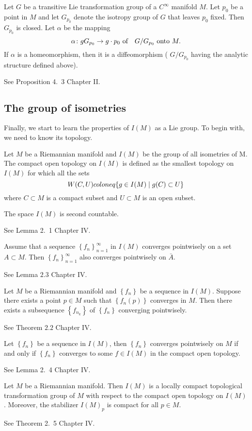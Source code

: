 \begin{proposition}
	Let $G$ be a transitive Lie transformation group of a
	$C^{\infty}$ manifold $M$. Let $p_{0}$ be a point in $M$ and
	let $G_{p_{0}}$ denote the isotropy group of $G$ that leaves
	$p_{0}$ fixed. Then $G_{p_0}$ is closed. Let $\alpha$ be the
	mapping
	\[
	\alpha\:g G_{p_{0}} \rightarrow g \cdot p_{0} \text { of \
	}\  G / G_{p_{0}} \text { onto } M.
	\]
	If $\alpha$ is a homeomorphism, then it is a diffeomorphism (
	$G / G_{p_{0}}$ having the analytic structure defined above).
\end{proposition}
\bproof
See \cite{Hel} Proposition 4.\ 3 Chapter II.
\eproof
\subsection{The group of isometries}

Finally, we start to learn the properties of $I(M)$ as a Lie
group. To begin with, we need to know its topology. 

\begin{definition}
	Let $M$ be a Riemannian manifold and $I(M)$ be the group of
	all isometries of
	M. The compact open topology on $I(M)$ is defined as the
	smallest topology on $I(M)$ for which all the sets
	\[
	W(C, U)\\coloneq \{ g \in I(M) \mid g (C) \subset U \}
	\]
	where $C \subset M$ is a compact subset and $U \subset M$ is
	an open subset.
\end{definition}
\begin{lemma}
	The space $I(M) $ is second countable.
\end{lemma}
\bproof
See \cite{Hel} Lemma 2.\ 1 Chapter IV.
\eproof
\begin{lemma}
	Assume that a sequence $\left\{ f_{n}
	\right\}_{n=1}^{\infty}$ in $I(M)$ converges pointwisely on a
	set $A \subset M$. Then $\left\{ f_{n}
	\right\}_{n=1}^{\infty}$ also converges pointwisely on
	$\bar{A}$.
\end{lemma}
\bproof
See \cite{Hel} Lemma $2.3$ Chapter IV.
\eproof
\begin{lemma}
	Let $M$ be a Riemannian manifold and $\left\{ f_{n} \right\}$
	be a sequence in $I(M) .$ Suppose there exists a point $p \in
	M$ such that $\left\{ f_{n} (p) \right\}$ converges in $M$.
	Then there exists a subsequence $\left\{f_{n_{k}}\right\}$ of
	$\left\{f_{n}\right\}$ converging pointwisely.
\end{lemma}
\bproof
See \cite{Hel} Theorem $2.2$ Chapter IV.
\eproof
\begin{theorem}
	Let $\left\{ f_{n} \right\}$ be a sequence in $I(M)$, then
	$\left\{ f_{n} \right\}$ converges pointwisely on $M$ if and
	only if $\left\{ f_{n} \right\}$ converges to some $f \in I(M)$
	in the compact open topology.
\end{theorem}
\bproof
See \cite{Hel} Lemma 2.\ 4 Chapter IV.
\eproof
\begin{theorem}
	Let $M$ be a Riemannian manifold. Then $I(M)$ is a locally
	compact topological
	transformation group of $M$ with respect to the compact open
	topology on $I(M)$. Moreover, the stabilizer  $I(M)_p$  is
	compact for all $p \in M$.
\end{theorem}
\bproof
See \cite{Hel} Theorem 2.\ 5 Chapter IV.
\eproof
